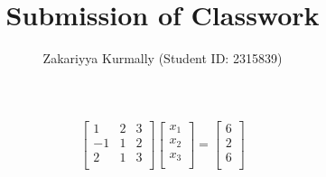 \documentclass[12pt, a4paper]{article}
\title{Submission of Classwork}
\author{Zakariyya Kurmally (Student ID: 2315839)}
\begin{document}
\maketitle
\begin{gather*}
  \left[ \begin{array}{ccc}
    1 & 2 & 3 \\
    -1 & 1 & 2 \\
    2 & 1 & 3 \\
  \end{array} \right] 
  \left[ \begin{array}{c}
    x_1 \\
    x_2 \\
    x_3 \\
  \end{array} \right] 
  = 
  \left[ \begin{array}{c}
    6 \\
    2 \\
    6 \\
  \end{array} \right] \\[5pt]
\end{gather*}
\end{document}
